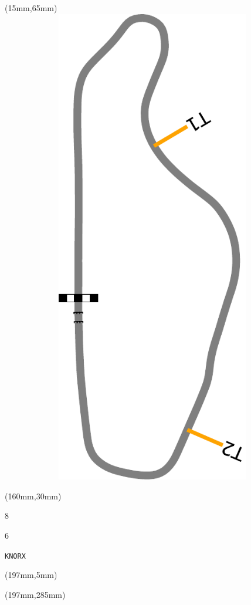 \begin{textblock*}{185mm}(15mm,65mm)%
\centering
\mbox{\includegraphics[width=185mm,height=210mm,keepaspectratio]{PT/KNORX.pdf}}
\end{textblock*}
\begin{textblock*}{40mm}(160mm,30mm)%
\Large
\par{} 
\par8 
\par6 
\par\hfill\tiny\tt KNORX\\
\end{textblock*}
\begin{textblock*}{20mm}(197mm,5mm)%
\fbox{\thepage}
\label{KNORX}
\end{textblock*}
\begin{textblock*}{20mm}(197mm,285mm)%
\fbox{\thepage}
\end{textblock*}

